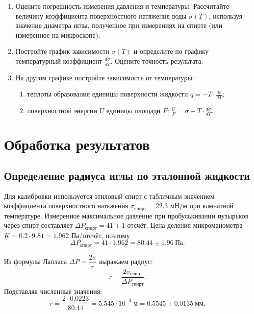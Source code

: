 \documentclass[a4paper]{article}
\begin{document}
\begin{enumerate}
		Проводить измерение температурной зависимости рекомендуется в диапазоне \(20^{\circ}\text{C}\) – \(60^{\circ}\text{C}\) через \(5^{\circ}\). Запрещается нагревать воду в термостате выше \(60^{\circ}\text{C}\).
		
		\item Оцените погрешность измерения давления и температуры. Рассчитайте величину коэффициента поверхностного натяжения воды \(\sigma(T)\), используя значение диаметра иглы, полученное при измерениях на спирте (или измеренное на микроскопе).
		
		\item Постройте график зависимости \(\sigma(T)\) и определите по графику температурный коэффициент \(\frac{d\sigma}{dT}\). Оцените точность результата.
		
		\item На другом графике постройте зависимость от температуры:
		\begin{enumerate}
			\item теплоты образования единицы поверхности жидкости \(q = -T \cdot \frac{d\sigma}{dT}\);
			\item поверхностной энергии \(U\) единицы площади \(F\): \(\frac{U}{F} = \sigma - T \cdot \frac{d\sigma}{dT}\).
		\end{enumerate}
	\end{enumerate}

	
	\section{Обработка результатов}
	
	\subsection{Определение радиуса иглы по эталонной жидкости}
	
	Для калибровки используется этиловый спирт с табличным значением коэффициента поверхностного натяжения
	\(\sigma_{\text{спирт}} = 22.3\) мН/м при комнатной температуре.
	Измеренное максимальное давление при пробулькивании пузырьков через спирт составляет
	\(\Delta P_{\text{спирт}} = 41 \pm 1\) отсчёт. Цена деления микроманометра
	\(K = 0.2 \cdot 9.81 = 1.962\) Па/отсчёт, поэтому
	\[
	\Delta P_{\text{спирт}} = 41 \cdot 1.962 = 80.44 \pm 1.96\ \text{Па}.
	\]
	
	Из формулы Лапласа \(\Delta P = \dfrac{2\sigma}{r}\) выражаем радиус:
	\[
	r = \frac{2\sigma_{\text{спирт}}}{\Delta P_{\text{спирт}}}.
	\]
	Подставляя численные значения:
	\[
	r = \frac{2 \cdot 0.0223}{80.44} = 5.545 \cdot 10^{-4}\ \text{м} = 0.5545 \pm 0.0135\ \text{мм}.
	\]
	
\end{document}
